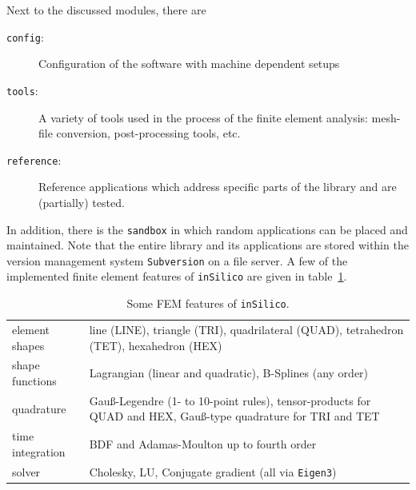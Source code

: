\documentclass[a4paper,DIV=12,10pt]{scrartcl}
\newcommand{\IS}[0]{\texttt{inSilico}}
\begin{document}
Next to the discussed modules, there are
\begin{description}
\item[\texttt{config}:] Configuration of the software with machine
  dependent setups
\item[\texttt{tools}:] A variety of tools used in the process of the
  finite element analysis: mesh-file conversion, post-processing
  tools, etc.
\item[\texttt{reference}:] Reference applications which address
  specific parts of the library and are (partially) tested.
\end{description}
In addition, there is the \texttt{sandbox} in which random
applications can be placed and maintained. Note that the entire
library and its applications are stored within the version management
system \texttt{Subversion} on a file server. A few of the implemented
finite element features of \IS{} are given in
table~\ref{tab:features}.
\begin{table}[bthp]
  \centering
  \begin{tabular}{lp{}}
    \toprule 
    element shapes 
    &line (LINE), triangle (TRI), quadrilateral (QUAD), tetrahedron (TET),
    hexahedron (HEX)\\
    shape functions 
    &Lagrangian (linear and quadratic), B-Splines (any order)\\
    quadrature 
    &Gau\ss{}-Legendre (1- to 10-point rules), tensor-products
    for QUAD and HEX, Gau\ss{}-type quadrature for TRI and TET\\
    time integration
    &BDF and Adamas-Moulton up to fourth order \\
    solver
    &Cholesky, LU, Conjugate gradient (all via \texttt{Eigen3})\\
    \bottomrule
  \end{tabular}
  \caption{Some FEM features of \IS{}.}
  \label{tab:features}
\end{table}
\end{document}
